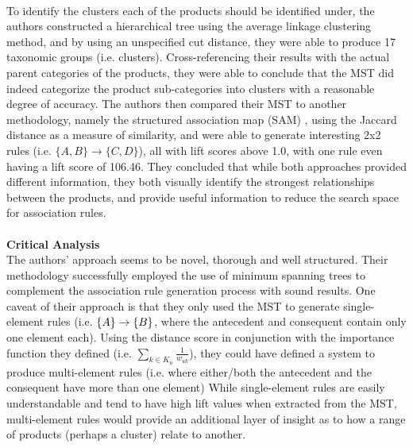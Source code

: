\\
To identify the clusters each of the products should be identified under, the authors constructed a hierarchical tree using the average linkage clustering method, and by using an unspecified cut distance, they were able to produce 17 taxonomic groups (i.e. clusters). Cross-referencing their results with the actual parent categories of the products, they were able to conclude that the MST did indeed categorize the product sub-categories into clusters with a reasonable degree of accuracy. The authors then compared their MST to another methodology, namely the structured association map (SAM) , using the Jaccard distance as a measure of similarity,  and were able to generate interesting 2x2 rules (i.e. $\{A,B\}\rightarrow\{C, D\}$), all with lift scores above 1.0, with one rule even having a lift score of 106.46. They concluded that while both approaches provided different information, they both visually identify the strongest relationships between the products, and provide useful information to reduce the search space for association rules.
\\\\\textbf{Critical Analysis}\\
The authors' approach seems to be novel,  thorough and well structured.  Their methodology successfully employed the use of minimum spanning trees to complement the association rule generation process with sound results.  One caveat of their approach is that they only used the MST to generate single-element rules (i.e. $\{A\}\rightarrow\{B\}$, where the antecedent and consequent contain only one element each). Using the distance score in conjunction with the importance function they defined (i.e. $\sum\limits_{k \in K_u}^{} \frac{1}{w_{uk}}$), they could have defined a system to produce multi-element rules (i.e. where either/both the antecedent and the consequent have more than one element) While single-element rules are easily understandable and tend to have high lift values when extracted from the MST, multi-element rules would provide an additional layer of insight as to how a range of products (perhaps a cluster) relate to another.

